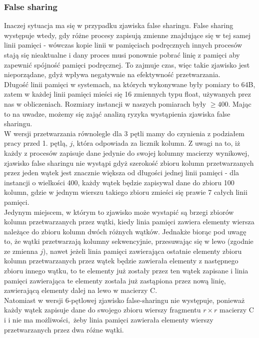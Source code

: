 \documentclass[10pt,a4paper]{article}
\begin{document}
\subsubsection*{False sharing}
Inaczej sytuacja ma się w przypadku zjawiska false sharingu. False sharing występuje wtedy, gdy
różne procesy zapisują zmienne znajdujące się w tej samej linii pamięci - wówczas kopie linii
w pamięciach podręcznych innych procesów stają się nieaktualne i dany proces musi ponownie pobrać
linię z pamięci aby zapewnić spójność pamięci podręcznej. To zajmuje czas, więc takie zjawisko
jest nieporządane, gdyż wpływa negatywnie na efektywność przetwarzania.\\
Długość linii pamięci w systemach, na których wykonywane były pomiary to 64B, zatem w każdej
linii pamięci mieści się 16 zmiennych typu float, używanych prez nas w obliczeniach. Rozmiary
instancji w naszych pomiarach były $\geq 400$. Mając to na uwadze, możemy się zająć analizą ryzyka
wystąpienia zjawiska false sharingu.\\

W wersji przetwarzania równolegle dla 3 pętli mamy do czynienia z podziałem pracy przed 1. pętlą, $j$,
która odpowiada za licznik kolumn.
Z uwagi na to, iż każdy z procesów zapisuje dane jedynie do swojej kolumny macierzy wynikowej,
zjawisko false sharingu nie wystąpi gdyż szerokość zbioru kolumn przetwarzanych przez jeden wątek jest
znacznie większa od długości jednej linii pamięci - dla instancji o wielkości 400, każdy wątek będzie
zapisywał dane do zbioru 100 kolumn, gdzie w jednym wierszu takiego zbioru zmieści się prawie 7 całych linii pamięci. \\
Jedynym miejscem, w którym to zjawisko może wystapić są brzegi zbiorów kolumn przetwarzanych przez wątki, kiedy linia pamięci
zawiera elementy wiersza należące do zbioru kolumn dwóch różnych wątków. Jednakże biorąc pod uwagę to, że wątki przetwarzają kolumny
sekwencyjnie, przesuwając się w lewo (zgodnie ze zmienna $j$), nawet jeżeli linia pamięci zawierająca ostatnie elementy zbioru kolumn przetwarzanych
przez wątek będzie zawierała elementy z następnego zbioru innego wątku, to te elementy już zostały przez ten wątek zapisane i linia pamięci zawierająca
te elementy została już zastąpiona przez nową linię, zawierającą elementy dalej na lewo w macierzy C.  \\

Natomiast w wersji 6-pętlowej zjawisko false-sharingu nie występuje, ponieważ każdy wątek zapisuje dane do swojego
zbioru wierszy fragmentu $r \times r$ macierzy C i i nie ma możliwości, żeby linia pamięci zawierała elementy wierszy przetwarzanych przez
dwa różne wątki.
\end{document}
